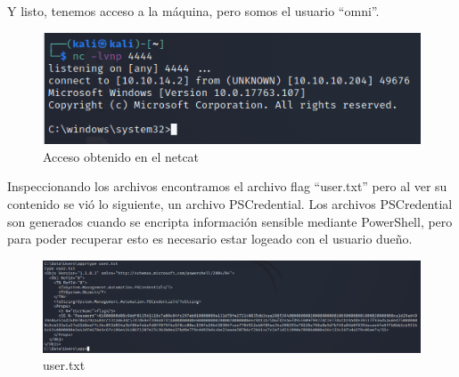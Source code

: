 \documentclass{article}
\begin{document}
Y listo, tenemos acceso a la máquina, pero somos el usuario “omni”.
\begin{figure}[H]
	\center
	\includegraphics[width=\textwidth]{images/omni/8.png}
	\caption{Acceso obtenido en el netcat}
\end{figure}

Inspeccionando los archivos encontramos el archivo flag “user.txt” pero al ver su contenido se vió lo siguiente, un archivo PSCredential. Los archivos PSCredential son generados cuando se encripta información sensible mediante PowerShell, pero para poder recuperar esto es necesario estar logeado con el usuario dueño.
\begin{figure}[H]
	\center
	\includegraphics[width=\textwidth]{images/omni/9.png}
	\caption{user.txt}
\end{figure}
\end{document}
